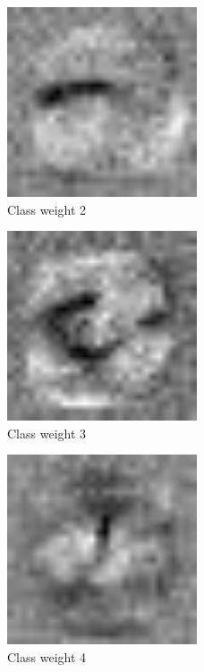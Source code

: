 \begin{figure}[]
    \centering
    \includegraphics[width=0.50\textwidth]{figures/weights/class_2_weight_image.jpg}
    \caption{Class weight 2}
    \label{fig:class_weight_2}
\end{figure}

\begin{figure}[]
    \centering
    \includegraphics[width=0.50\textwidth]{figures/weights/class_3_weight_image.jpg}
    \caption{Class weight 3}
    \label{fig:class_weight_3}
\end{figure}

\begin{figure}[]
    \centering
    \includegraphics[width=0.50\textwidth]{figures/weights/class_4_weight_image.jpg}
    \caption{Class weight 4}
    \label{fig:class_weight_4}
\end{figure}

